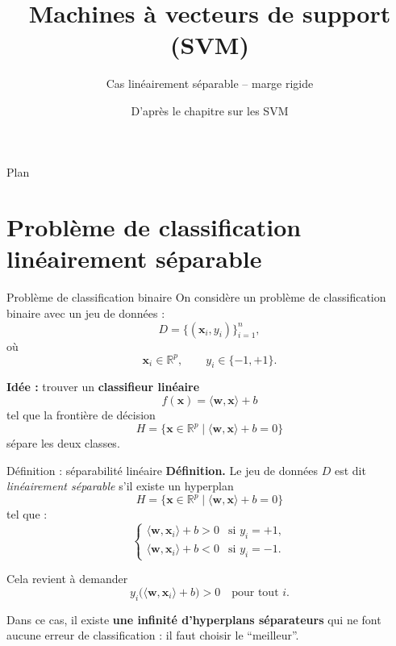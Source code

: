 \documentclass[aspectratio=169]{beamer}
\title{Machines à vecteurs de support (SVM)}
\subtitle{Cas linéairement séparable -- marge rigide}
\author{D'après le chapitre sur les SVM}
\date{}
\begin{document}
\begin{frame}
  \titlepage
\end{frame}

\begin{frame}{Plan}
  \tableofcontents
\end{frame}

\section{Problème de classification linéairement séparable}

\begin{frame}{Problème de classification binaire}
  On considère un problème de classification binaire avec un jeu de données :
  \[
    D = \{(\bm{x}_i, y_i)\}_{i=1}^n,
  \]
  où
  \[
    \bm{x}_i \in \mathbb{R}^p, \qquad y_i \in \{-1, +1\}.
  \]

  \vspace{0.5cm}
  \textbf{Idée :} trouver un \textbf{classifieur linéaire}
  \[
    f(\bm{x}) = \langle \bm{w}, \bm{x} \rangle + b
  \]
  tel que la frontière de décision
  \[
    H = \{\bm{x} \in \mathbb{R}^p \mid \langle \bm{w}, \bm{x} \rangle + b = 0\}
  \]
  sépare les deux classes.
\end{frame}

\begin{frame}{Définition : séparabilité linéaire}
  \textbf{Définition.} Le jeu de données $D$ est dit \emph{linéairement séparable} s'il existe un hyperplan
  \[
    H = \{\bm{x} \in \mathbb{R}^p \mid \langle \bm{w}, \bm{x} \rangle + b = 0\}
  \]
  tel que :
  \[
    \begin{cases}
      \langle \bm{w}, \bm{x}_i \rangle + b > 0 & \text{si } y_i = +1,\\[0.2cm]
      \langle \bm{w}, \bm{x}_i \rangle + b < 0 & \text{si } y_i = -1.
    \end{cases}
  \]

  \vspace{0.3cm}
  Cela revient à demander
  \[
    y_i \bigl( \langle \bm{w}, \bm{x}_i \rangle + b \bigr) > 0 \quad \text{pour tout } i.
  \]

  \vspace{0.3cm}
  Dans ce cas, il existe \textbf{une infinité d'hyperplans séparateurs} qui ne font aucune erreur
  de classification : il faut choisir le ``meilleur''.
\end{frame}
\end{document}
